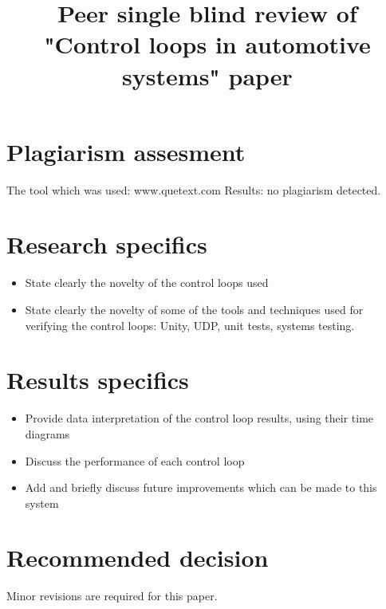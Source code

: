 \documentclass{article}
\begin{document}
\title{Peer single blind review of "Control loops in automotive systems" paper}

\author{}

\maketitle

\section{Plagiarism assesment}

The tool which was used: www.quetext.com Results: no plagiarism detected.

\section{Research specifics}

\begin{itemize}
    
    \item State clearly the novelty of the control loops used
    \item State clearly the novelty of some of the tools and techniques used for verifying the control loops: Unity, UDP, unit tests, systems testing.
    
\end{itemize}

\section{Results specifics}

\begin{itemize}

    \item Provide data interpretation of the control loop results, using their time diagrams
    \item Discuss the performance of each control loop
    \item Add and briefly discuss future improvements which can be made to this system

\end{itemize}

\section{Recommended decision}

Minor revisions are required for this paper.
\end{document}
